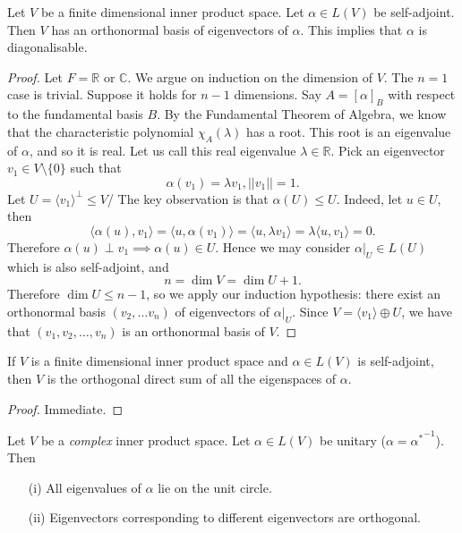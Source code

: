 \documentclass[egregdoesnotlikesansseriftitles,a4paper]{scrartcl}
\begin{document}
\begin{theorem}
      Let $V$ be a finite dimensional inner product space. Let $\alpha \in L (V)$ be self-adjoint. Then $V$ has an orthonormal basis of eigenvectors of $\alpha$. This implies that $\alpha$ is diagonalisable.
\end{theorem}
\begin{proof}
      Let $F=\mathbb{R}$ or $\mathbb{C}$. We argue on induction on the dimension of $V$. The $n=1$ case is trivial. Suppose it holds for $n-1$ dimensions. Say $A=[\alpha]_B$ with respect to the fundamental basis $B$. By the Fundamental Theorem of Algebra, we know that the characteristic polynomial $\chi_A (\lambda)$ has a root. This root is an eigenvalue of $\alpha$, and so it is real. Let us call this real eigenvalue $\lambda \in \mathbb{R}$. Pick an eigenvector $v_1 \in V \setminus \{0\}$ such that 
      \[\alpha (v_1)= \lambda v_1, ||v_1||=1.\]
      Let $U=\langle v_1 \rangle^\perp \leq V$/
      The key observation is that $\alpha (U) \leq U$. Indeed, let $u \in U$, then 
      \[\langle \alpha (u), v_1 \rangle =\langle u,\alpha (v_1) \rangle =\langle u, \lambda v_1 \rangle =\lambda \langle u,v_1 \rangle =0.\]
      Therefore $\alpha (u)\perp v_1 \implies \alpha (u) \in U$. Hence we may consider $\alpha|_U \in L (U)$ which is also self-adjoint, and 
      \[n=\operatorname{dim}V=\operatorname{dim}U+1.\]
      Therefore $\operatorname{dim}U \leq n-1$, so we apply our induction hypothesis: there exist an orthonormal basis $(v_2,\ldots v_n)$ of eigenvectors of $\alpha|_U$. Since $V=\langle v_1 \rangle \oplus U$, we have that $(v_1,v_2, \ldots , v_n)$ is an orthonormal basis of $V$.
\end{proof}
\begin{corollary}
     If $V$ is a finite dimensional inner product space and $\alpha \in L (V)$ is self-adjoint, then $V$ is the orthogonal direct sum of all the eigenspaces of $\alpha$.
\end{corollary}
\begin{proof}
      Immediate.
\end{proof}

\begin{lemma}
      Let $V$ be a \emph{complex} inner product space. Let $\alpha \in L (V)$ be unitary ($\alpha={\alpha^*}^{-1}$). Then
      \begin{itemize}
           \item[(i)]All eigenvalues of $\alpha$ lie on the unit circle.
           \item[(ii)]Eigenvectors corresponding to different eigenvectors are orthogonal. 
      \end{itemize}
\end{lemma}
\end{document}

